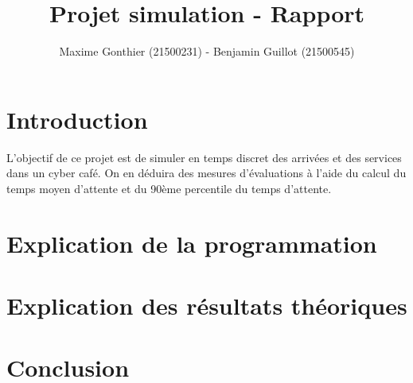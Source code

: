 \documentclass[a4paper,11pt]{article}
\title{Projet simulation - Rapport}
\author{Maxime Gonthier (21500231) - Benjamin Guillot (21500545)}
\begin{document}
\clearpage
\maketitle

\newpage
\tableofcontents

\newpage
\section{Introduction}
	L'objectif de ce projet est de simuler en temps discret des arrivées et des services dans un cyber café. On en déduira des mesures d'évaluations à l'aide du calcul du temps moyen d'attente et du 90ème percentile du temps d'attente. 
	
\section{Explication de la programmation}

\section{Explication des résultats théoriques}
	
\section{Conclusion}
	
\end{document}
